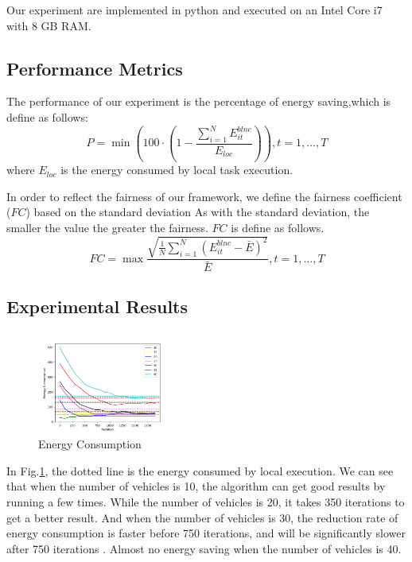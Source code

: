 \documentclass[conference]{IEEEtran}
\begin{document}
Our experiment are implemented in python and executed on an Intel Core i7 with 8 GB RAM.


\subsection{Performance Metrics}
The performance of our experiment is the percentage of energy saving,which is define as follows:
\begin{equation}
	P = \min (100 \cdot 
	( 1-
	\frac{
		 \sum \limits _{i=1}^{N} E^{blnc}_{it}   }{E_{loc}})), t = 1,\dots,T
\end{equation}
where $E_{loc}$ is the energy consumed by local task execution. 

In order to reflect the fairness of our framework, we define the fairness coefficient ($FC$) based on the standard deviation
As with the standard deviation, the smaller the value the greater the fairness. $FC$ is define as follows.
\begin{equation}
	FC=\max \frac{\sqrt{\frac{1}{N} \sum_{i=1}^{N}\left(E_{it}^{b l n c}-\bar{E}\right)^{2}}}{\bar{E}}, t = 1,\dots,T
\end{equation}

\subsection{Experimental Results}
\begin{figure}[htbp]
	\centering
	\includegraphics[width=0.40\textwidth]{energy.png}
	\caption{Energy Consumption}
	\label{energy}
\end{figure}
In Fig.\ref{energy}, the dotted line is the energy consumed by local execution. 
We can see that when the number of vehicles is 10, the algorithm can get good results by running a few times. While the number of vehicles is 20, it takes 350 iterations to get a better result. 
And when the number of vehicles is 30, the reduction rate of energy consumption is faster before 750 iterations, and will be significantly slower after 750 iterations . 
Almost no energy saving when the number of vehicles is 40. 
\end{document}
